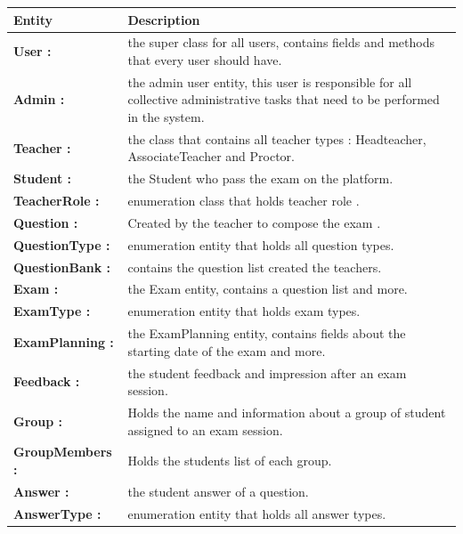 \documentclass[]{uc2pfecaneva}
\begin{document}
\begin{table}
        \begin{tabularx}{\textwidth}{|l|X|}
            \hline
            Entity          & Description                                                                                              \\ \hline
            \textbf{User :} & the super class for all users, contains fields and methods that every user should have.\\ \hline
            \textbf{Admin :} & the admin user entity, this user is responsible for all collective administrative tasks that need to be performed in the system.\\ \hline
            \textbf{Teacher :} & the class that contains all teacher types : Headteacher, AssociateTeacher and Proctor.\\ \hline
            \textbf{Student :} & the Student who pass the exam on the platform.\\ \hline
            \textbf{TeacherRole :} & enumeration class that holds teacher role .\\ \hline
            \textbf{Question :} & Created by the teacher to compose the exam .\\ \hline
            \textbf{QuestionType :} & enumeration entity that holds all question types.\\ \hline
            \textbf{QuestionBank :} & contains the question list created the teachers.\\ \hline
            \textbf{Exam :} & the Exam entity, contains a question list and more.\\ \hline
            \textbf{ExamType :} & enumeration entity that holds exam types.\\ \hline
            \textbf{ExamPlanning :} & the ExamPlanning entity, contains fields about the starting date of the exam and more.\\ \hline
            \textbf{Feedback :} & the student feedback and impression after an exam session.\\ \hline
            \textbf{Group :} & Holds the name and information about a group of student assigned to an exam session.\\ \hline
            \textbf{GroupMembers :} & Holds the students list of each group.\\ \hline
            \textbf{Answer :} & the student answer of a question.\\ \hline
            \textbf{AnswerType :} & enumeration entity that holds all answer types.\\ \hline

\end{tabularx}
\end{table}
\end{document}
